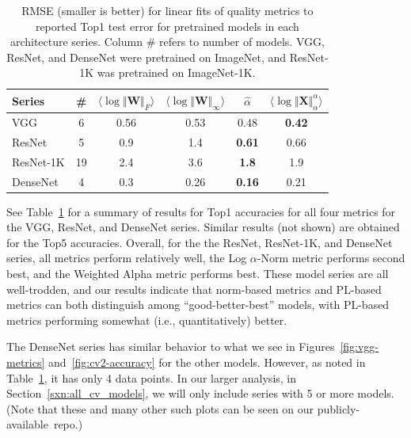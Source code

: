 \begin{table}[t]
\small
\begin{center}
\begin{tabular}{|p{0.65in}|c|c|c|c|c|}
\hline
 Series    &\#   & $\langle\log\Vert\mathbf{W}\Vert_{F}\rangle$ & $\langle\log\Vert\mathbf{W}\Vert_{\infty}\rangle$ & $\hat{\alpha}$ & $\langle\log\Vert\mathbf{X}\Vert^{\alpha}_{\alpha}\rangle$ \\
\hline
 VGG       &  6 & 0.56 & 0.53 & 0.48          & \textbf{0.42}  \\
 ResNet    &  5 & 0.9  & 1.4  & \textbf{0.61} & 0.66           \\
 ResNet-1K & 19 & 2.4  & 3.6  & \textbf{1.8}  & 1.9            \\
 DenseNet  &  4 & 0.3  & 0.26 & \textbf{0.16} & 0.21           \\
\hline
\end{tabular}
\end{center}
\caption{RMSE (smaller is better) for linear fits of 
         quality metrics to reported Top1 test error for pretrained models in each architecture series.  Column \# refers to number of models.  VGG, ResNet, and DenseNet were pretrained on ImageNet, and ResNet-1K was pretrained on ImageNet-1K. 
}
\label{table:cv-models}
\end{table}

See Table~\ref{table:cv-models} for a summary of results for Top1 accuracies for all four metrics for the VGG, ResNet, and DenseNet series.
Similar results (not shown) are obtained for the Top5 accuracies.
Overall, for the the ResNet, ResNet-1K, and DenseNet series, all metrics perform relatively well, the Log $\alpha$-Norm metric performs second best, and the Weighted Alpha metric performs best.
These model series are all well-trodden, and our results indicate that norm-based metrics and PL-based metrics can both distinguish among ``good-better-best'' models, with PL-based metrics performing somewhat (i.e., quantitatively) better.

The DenseNet series has similar behavior to what we see in Figures~\ref{fig:vgg-metrics} and~\ref{fig:cv2-accuracy} for the other models.
However, as noted in Table~\ref{table:cv-models}, it has only 4 data points.  
In our larger analysis, in Section~\ref{sxn:all_cv_models}, we will only include series with 5 or more models.
(Note that these and many other such plots can be seen on our publicly-available~repo.)


